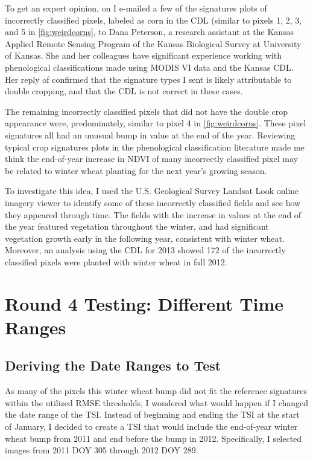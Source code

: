 To get an expert opinion, on  I e-mailed a few of the signatures plots of incorrectly classified pixels, labeled as corn in the CDL (similar to pixels 1, 2, 3, and 5 in \cref{fig:weirdcorns}, to Dana Peterson, a research assistant at the Kansas Applied Remote Sensing Program of the Kansas Biological Survey at University of Kansas. She and her colleagues have significant experience working with phenological classifications made using MODIS VI data and the Kansas CDL. Her reply of  confirmed that the signature types I sent is likely attributable to double cropping, and that the CDL is not correct in these cases.

The remaining incorrectly classified pixels that did not have the double crop appearance were, predominately, similar to pixel 4 in \cref{fig:weirdcorns}. These pixel signatures all had an unusual bump in value at the end of the year. Reviewing typical crop signatures plots in the phenological classification literature made me think the end-of-year increase in NDVI of many incorrectly classified pixel may be related to winter wheat planting for the next year’s growing season.

To investigate this idea, I used the U.S. Geological Survey Landsat Look online imagery viewer to identify some of these incorrectly classified fields and see how they appeared through time. The fields with the increase in values at the end of the year featured vegetation throughout the winter, and had significant vegetation growth early in the following year, consistent with winter wheat. Moreover, an analysis using the CDL for 2013 showed 172 of the incorrectly classified pixels were planted with winter wheat in fall 2012.


\section{Round 4 Testing: Different Time Ranges}
\label{appendix:testing:r4}

\subsection*{Deriving the Date Ranges to Test}

As many of the pixels this winter wheat bump did not fit the reference signatures within the utilized RMSE thresholds, I wondered what would happen if I changed the date range of the TSI. Instead of beginning and ending the TSI at the start of January, I decided to create a TSI that would include the end-of-year winter wheat bump from 2011 and end before the bump in 2012. Specifically, I selected images from 2011 DOY 305 through 2012 DOY 289.

